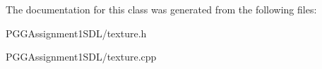 The documentation for this class was generated from the following files\+:\begin{DoxyCompactItemize}
\item 
P\+G\+G\+Assignment1\+S\+D\+L/texture.\+h\item 
P\+G\+G\+Assignment1\+S\+D\+L/texture.\+cpp\end{DoxyCompactItemize}

